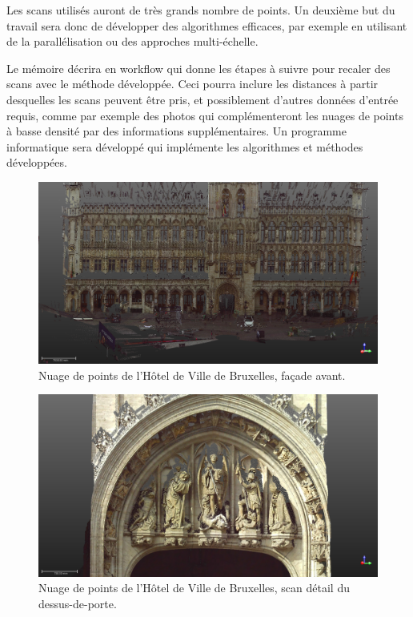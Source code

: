 \documentclass[a4paper,10pt]{scrreprt}
\begin{document}
Les scans utilisés auront de très grands nombre de points. Un deuxième but du travail sera donc de développer des algorithmes efficaces, par exemple en utilisant de la parallélisation ou des approches multi-échelle.

Le mémoire décrira en workflow qui donne les étapes à suivre pour recaler des scans avec le méthode développée. Ceci pourra inclure les distances à partir desquelles les scans peuvent être pris, et possiblement d'autres données d'entrée requis, comme par exemple des photos qui complémenteront les nuages de points à basse densité par des informations supplémentaires. Un programme informatique sera développé qui implémente les algorithmes et méthodes développées.

\begin{figure}[p]
\includegraphics[width=\textwidth]{HotelDeVille_06.png}
\caption{Nuage de points de l'Hôtel de Ville de Bruxelles, façade avant.}
\label{fig:bru_townhall_first}
\label{fig:bru_townhall_front}
\end{figure}

\begin{figure}[p]
\includegraphics[width=\textwidth]{HotelDeVille_08.png}
\caption{Nuage de points de l'Hôtel de Ville de Bruxelles, scan détail du dessus-de-porte.}
\label{fig:bru_townhall_door}
\end{figure}
\end{document}
